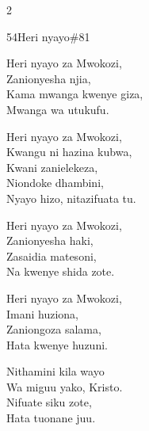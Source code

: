\begin{multicols}{2}
\begin{hymn}{54}{Heri nyayo}{\#81}
\begin{stanza}
Heri nyayo za Mwokozi,\\
Zanionyesha njia,\\
Kama mwanga kwenye giza,\\
Mwanga wa utukufu.
\end{stanza}
\begin{chorus}
Heri nyayo za Mwokozi,\\
Kwangu ni hazina kubwa,\\
Kwani zanielekeza,\\
Niondoke dhambini,\\
Nyayo hizo, nitazifuata tu.
\end{chorus}
\begin{stanza}
Heri nyayo za Mwokozi,\\
Zanionyesha haki,\\
Zasaidia matesoni,\\
Na kwenye shida zote.
\end{stanza}
\begin{stanza}
Heri nyayo za Mwokozi,\\
Imani huziona,\\
Zaniongoza salama,\\
Hata kwenye huzuni.
\end{stanza}
\begin{stanza}
Nithamini kila wayo\\
Wa miguu yako, Kristo.\\
Nifuate siku zote,\\
Hata tuonane juu.
\end{stanza}
\end{hymn}


\end{multicols}
